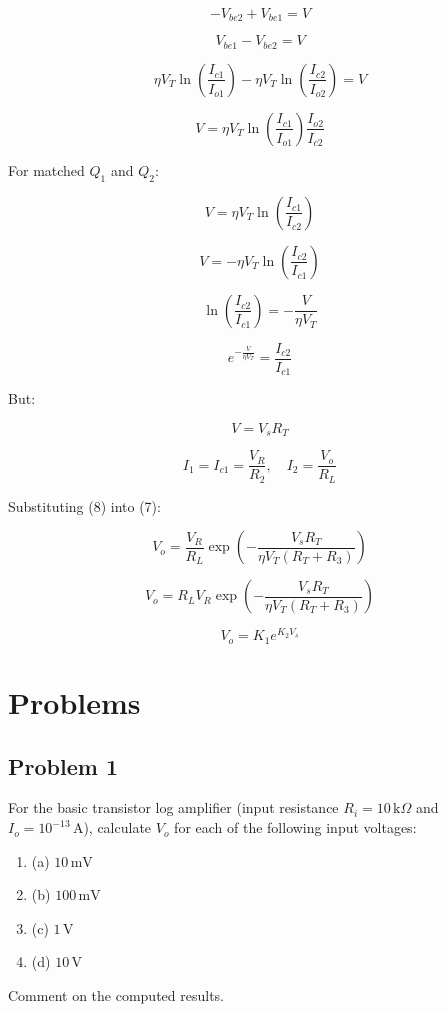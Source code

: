 \documentclass[a4paper,9pt,twoside,openany,twocolumn]{memoir}
\begin{document}
\[
-V_{be2} + V_{be1} = V \tag{1}
\]

\[
V_{be1} - V_{be2} = V
\]

\[
\eta V_T \ln \left(\frac{I_{c1}}{I_{o1}}\right) - \eta V_T \ln \left(\frac{I_{c2}}{I_{o2}}\right) = V \tag{2}
\]

\[
V = \eta V_T \ln \left(\frac{I_{c1}}{I_{o1}}\right) \frac{I_{o2}}{I_{c2}} \tag{3}
\]

For matched \( Q_1 \) and \( Q_2 \):

\[
V = \eta V_T \ln \left(\frac{I_{c1}}{I_{c2}}\right) \tag{4}
\]

\[
V = -\eta V_T \ln \left(\frac{I_{c2}}{I_{c1}}\right) \tag{5}
\]

\[
\ln \left(\frac{I_{c2}}{I_{c1}}\right) = - \frac{V}{\eta V_T} \tag{6}
\]

\[
e^{-\frac{V}{\eta V_T}} = \frac{I_{c2}}{I_{c1}} \tag{7}
\]

But:

\[
V = V_s R_T \tag{8}
\]

\[
I_1 = I_{c1} = \frac{V_R}{R_2}, \quad I_2 = \frac{V_o}{R_L}
\]

Substituting (8) into (7):

\[
V_o = \frac{V_R}{R_L} \exp\left(- \frac{V_s R_T}{\eta V_T (R_T + R_3)}\right) \tag{9}
\]

\[
V_o = R_L V_R \exp\left(- \frac{V_s R_T}{\eta V_T (R_T + R_3)}\right) \tag{10}
\]

\[
V_o = K_1 e^{K_2 V_s} \tag{11}
\]

\section*{Problems}

\subsection*{Problem 1}
For the basic transistor log amplifier (input resistance \( R_i = 10 \, \text{k}\Omega \) and \( I_o = 10^{-13} \, \text{A} \)), calculate \( V_o \) for each of the following input voltages:
\begin{enumerate}
    \item (a) \( 10 \, \text{mV} \)
    \item (b) \( 100 \, \text{mV} \)
    \item (c) \( 1 \, \text{V} \)
    \item (d) \( 10 \, \text{V} \)
\end{enumerate}
Comment on the computed results.
\end{document}
